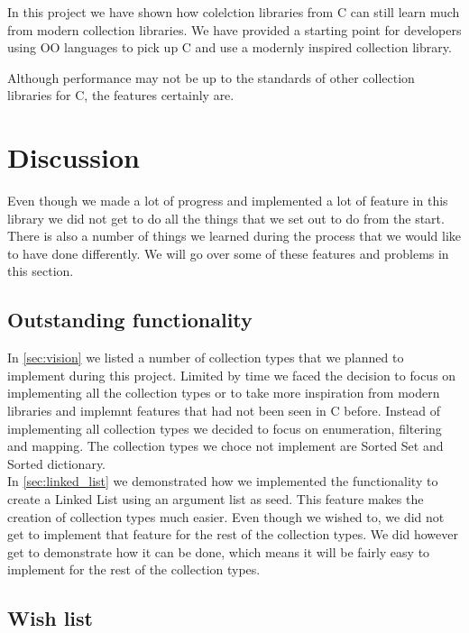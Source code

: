 \documentclass[table]{ituthesis}
\begin{document}
	In this project we have shown how colelction libraries from C can still learn much from modern collection libraries. We have provided a starting point for developers using OO languages to pick up C and use a modernly inspired collection library.
	
	Although performance may not be up to the standards of other collection libraries for C, the features certainly are.
	
	
	\section{Discussion}\label{sec:discussion}
	
		Even though we made a lot of progress and implemented a lot of feature in this library we did not get to do all the things that we set out to do from the start. There is also a number of things we learned during the process that we would like to have done differently. We will go over some of these features and problems in this section.
		
		\subsection{Outstanding functionality}
		
			In \autoref{sec:vision} we listed a number of collection types that we planned to implement during this project. Limited by time we faced the decision to focus on implementing all the collection types or to take more inspiration from modern libraries and implemnt features that had not been seen in C before. Instead of implementing all collection types we decided to focus on enumeration, filtering and mapping. The collection types we choce not implement are Sorted Set and Sorted dictionary.\\
			
			In \autoref{sec:linked_list} we demonstrated how we implemented the functionality to create a Linked List using an argument list as seed. This feature makes the creation of collection types much easier. Even though we wished to, we did not get to implement that feature for the rest of the collection types. We did however get to demonstrate how it can be done, which means it will be fairly easy to implement for the rest of the collection types.
			
		
		\subsection{Wish list}\label{sec:wishlist}
			
\end{document}
